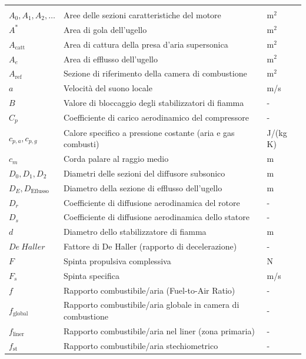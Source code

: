 \begin{longtable}{p{} p{} p{}}
    \hline
    \endlastfoot
    \multicolumn{3}{l}{\textbf{Simboli Latini ed Acronimi}} \\[4px]
    $A_0, A_1, A_2, \dots$ & Aree delle sezioni caratteristiche del motore & $\text{m}^2$ \\[2px]
    $A^*$ & Area di gola dell'ugello & $\text{m}^2$ \\[2px]
    $A_{\text{catt}}$ & Area di cattura della presa d'aria supersonica & $\text{m}^2$ \\[2px]
    $A_e$ & Area di efflusso dell'ugello & $\text{m}^2$ \\[2px]
    $A_{\text{ref}}$ & Sezione di riferimento della camera di combustione & $\text{m}^2$ \\[2px]
    $a$ & Velocità del suono locale & m/s \\[2px]
    $B$ & Valore di bloccaggio degli stabilizzatori di fiamma & - \\[2px]
    $C_p$ & Coefficiente di carico aerodinamico del compressore & - \\[2px]
    $c_{p,a}, c_{p,g}$ & Calore specifico a pressione costante (aria e gas combusti) & J/(kg K) \\[2px]
    $c_m$ & Corda palare al raggio medio & m \\[2px]
    $D_0, D_1, D_2$ & Diametri delle sezioni del diffusore subsonico & m \\[2px]
    $D_E, D_{\text{Eflusso}}$ & Diametro della sezione di efflusso dell'ugello & m \\[2px]
    $D_r$ & Coefficiente di diffusione aerodinamica del rotore & - \\[2px]
    $D_s$ & Coefficiente di diffusione aerodinamica dello statore & - \\[2px]
    $d$ & Diametro dello stabilizzatore di fiamma & m \\[2px]
    $De~Haller$ & Fattore di De Haller (rapporto di decelerazione) & - \\[2px]
    $F$ & Spinta propulsiva complessiva & N \\[2px]
    $F_s$ & Spinta specifica  & m/s \\[2px]
    $f$ & Rapporto combustibile/aria (Fuel-to-Air Ratio) & - \\[2px]
    $f_{\text{global}}$ & Rapporto combustibile/aria globale in camera di combustione & - \\[2px]
    $f_{\text{liner}}$ & Rapporto combustibile/aria nel liner (zona primaria) & - \\[2px]
    $f_{\text{st}}$ & Rapporto combustibile/aria stechiometrico & - \\[2px]

\end{longtable}
